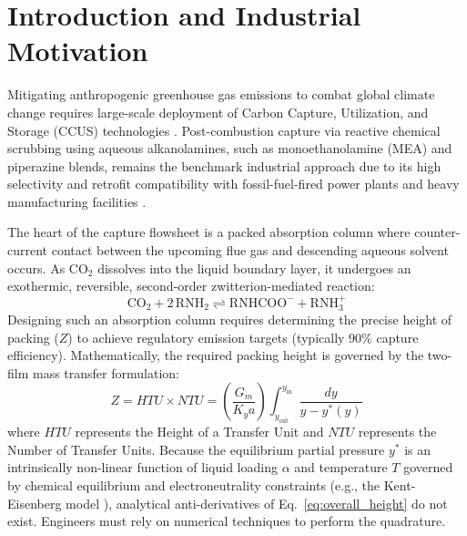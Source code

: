 \documentclass[11pt,a4paper]{article}
\begin{document}
\vspace{1.5em}

\section{Introduction and Industrial Motivation}
Mitigating anthropogenic greenhouse gas emissions to combat global climate change requires large-scale deployment of Carbon Capture, Utilization, and Storage (CCUS) technologies \cite{rochelle2009amine}. Post-combustion capture via reactive chemical scrubbing using aqueous alkanolamines, such as monoethanolamine (MEA) and piperazine blends, remains the benchmark industrial approach due to its high selectivity and retrofit compatibility with fossil-fuel-fired power plants and heavy manufacturing facilities \cite{danckwerts1970gas}. 

The heart of the capture flowsheet is a packed absorption column where counter-current contact between the upcoming flue gas and descending aqueous solvent occurs. As $\text{CO}_2$ dissolves into the liquid boundary layer, it undergoes an exothermic, reversible, second-order zwitterion-mediated reaction:
\begin{equation}
\text{CO}_2 + 2\,\text{RNH}_2 \rightleftharpoons \text{RNHCOO}^- + \text{RNH}_3^+
\label{eq:reaction}
\end{equation}
Designing such an absorption column requires determining the precise height of packing ($Z$) to achieve regulatory emission targets (typically $90\%$ capture efficiency). Mathematically, the required packing height is governed by the two-film mass transfer formulation:
\begin{equation}
Z = HTU \times NTU = \left( \frac{G_m}{K_y a} \right) \int_{y_{\text{out}}}^{y_{\text{in}}} \frac{dy}{y - y^*(y)}
\label{eq:overall_height}
\end{equation}
where $HTU$ represents the Height of a Transfer Unit and $NTU$ represents the Number of Transfer Units. Because the equilibrium partial pressure $y^*$ is an intrinsically non-linear function of liquid loading $\alpha$ and temperature $T$ governed by chemical equilibrium and electroneutrality constraints (e.g., the Kent-Eisenberg model \cite{kenteisenberg1976}), analytical anti-derivatives of Eq.~\eqref{eq:overall_height} do not exist. Engineers must rely on numerical techniques to perform the quadrature. 
\end{document}
